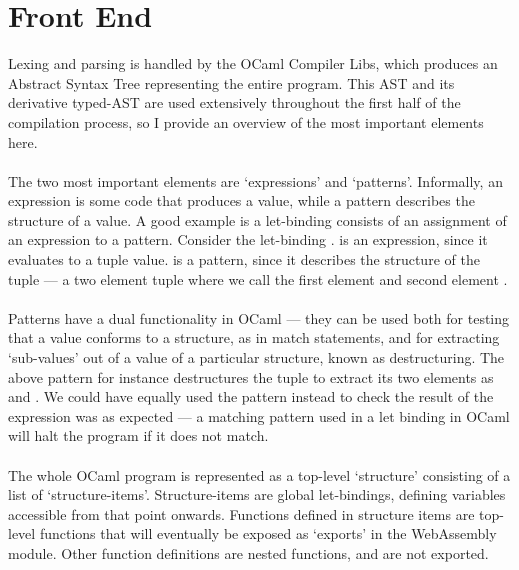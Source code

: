 \section{Front End}
Lexing and parsing is handled by the OCaml Compiler Libs, which produces an Abstract Syntax Tree representing the entire program. This AST and its derivative typed-AST are used extensively throughout the first half of the compilation process, so I provide an overview of the most important elements here.
\\\\
The two most important elements are `expressions' and `patterns'. Informally, an expression is some code that produces a value, while a pattern describes the structure of a value. A good example is a let-binding consists of an assignment of an expression to a pattern. Consider the let-binding .  is an expression, since it evaluates to a tuple value.  is a pattern, since it describes the structure of the tuple --- a two element tuple where we call the first element  and second element .
\\\\
Patterns have a dual functionality in OCaml --- they can be used both for testing that a value conforms to a structure, as in match statements, and for extracting `sub-values' out of a value of a particular structure, known as destructuring. The above pattern for instance destructures the tuple to extract its two elements as  and . We could have equally used the pattern  instead to check the result of the expression was as expected --- a matching pattern used in a let binding in OCaml will halt the program if it does not match.
\\\\
The whole OCaml program is represented as a top-level `structure' consisting of a list of `structure-items'. Structure-items are global let-bindings, defining variables accessible from that point onwards. Functions defined in structure items are top-level functions that will eventually be exposed as `exports' in the WebAssembly module. Other function definitions are nested functions, and are not exported.



